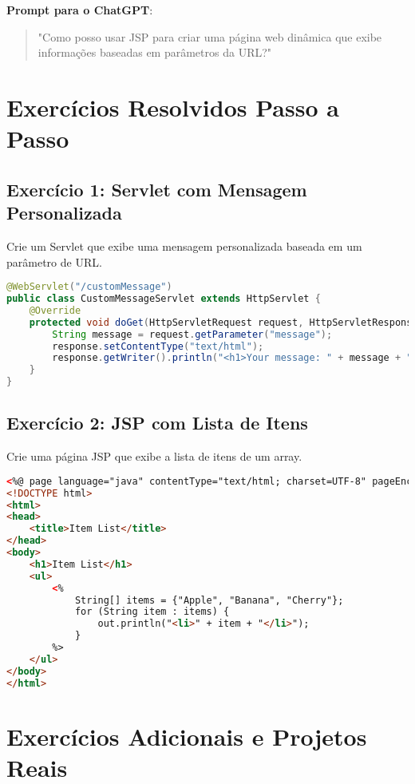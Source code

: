 \documentclass[a4paper,12pt]{book}
\begin{document}
\textbf{Prompt para o ChatGPT}:
\begin{quote}
"Como posso usar JSP para criar uma página web dinâmica que exibe informações baseadas em parâmetros da URL?"
\end{quote}

\section{Exercícios Resolvidos Passo a Passo}

\subsection{Exercício 1: Servlet com Mensagem Personalizada}
Crie um Servlet que exibe uma mensagem personalizada baseada em um parâmetro de URL.

\begin{lstlisting}[language=java,caption={Exercício 1: Código do Servlet}]
@WebServlet("/customMessage")
public class CustomMessageServlet extends HttpServlet {
    @Override
    protected void doGet(HttpServletRequest request, HttpServletResponse response) throws ServletException, IOException {
        String message = request.getParameter("message");
        response.setContentType("text/html");
        response.getWriter().println("<h1>Your message: " + message + "</h1>");
    }
}
\end{lstlisting}

\subsection{Exercício 2: JSP com Lista de Itens}
Crie uma página JSP que exibe a lista de itens de um array.

\begin{lstlisting}[language=html,caption={Exercício 2: Código JSP}]
<%@ page language="java" contentType="text/html; charset=UTF-8" pageEncoding="UTF-8"%>
<!DOCTYPE html>
<html>
<head>
    <title>Item List</title>
</head>
<body>
    <h1>Item List</h1>
    <ul>
        <% 
            String[] items = {"Apple", "Banana", "Cherry"};
            for (String item : items) {
                out.println("<li>" + item + "</li>");
            }
        %>
    </ul>
</body>
</html>
\end{lstlisting}

\section{Exercícios Adicionais e Projetos Reais}
\end{document}
